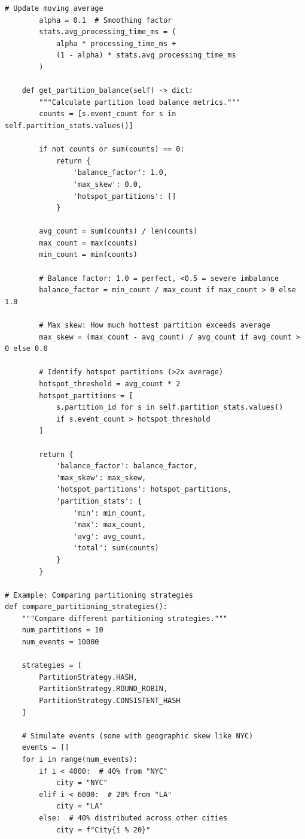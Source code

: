 \begin{lstlisting}[style=python, caption={Data Partitioning Strategies}]
        # Update moving average
        alpha = 0.1  # Smoothing factor
        stats.avg_processing_time_ms = (
            alpha * processing_time_ms +
            (1 - alpha) * stats.avg_processing_time_ms
        )

    def get_partition_balance(self) -> dict:
        """Calculate partition load balance metrics."""
        counts = [s.event_count for s in self.partition_stats.values()]

        if not counts or sum(counts) == 0:
            return {
                'balance_factor': 1.0,
                'max_skew': 0.0,
                'hotspot_partitions': []
            }

        avg_count = sum(counts) / len(counts)
        max_count = max(counts)
        min_count = min(counts)

        # Balance factor: 1.0 = perfect, <0.5 = severe imbalance
        balance_factor = min_count / max_count if max_count > 0 else 1.0

        # Max skew: How much hottest partition exceeds average
        max_skew = (max_count - avg_count) / avg_count if avg_count > 0 else 0.0

        # Identify hotspot partitions (>2x average)
        hotspot_threshold = avg_count * 2
        hotspot_partitions = [
            s.partition_id for s in self.partition_stats.values()
            if s.event_count > hotspot_threshold
        ]

        return {
            'balance_factor': balance_factor,
            'max_skew': max_skew,
            'hotspot_partitions': hotspot_partitions,
            'partition_stats': {
                'min': min_count,
                'max': max_count,
                'avg': avg_count,
                'total': sum(counts)
            }
        }

# Example: Comparing partitioning strategies
def compare_partitioning_strategies():
    """Compare different partitioning strategies."""
    num_partitions = 10
    num_events = 10000

    strategies = [
        PartitionStrategy.HASH,
        PartitionStrategy.ROUND_ROBIN,
        PartitionStrategy.CONSISTENT_HASH
    ]

    # Simulate events (some with geographic skew like NYC)
    events = []
    for i in range(num_events):
        if i < 4000:  # 40% from "NYC"
            city = "NYC"
        elif i < 6000:  # 20% from "LA"
            city = "LA"
        else:  # 40% distributed across other cities
            city = f"City{i % 20}"


\end{lstlisting}

